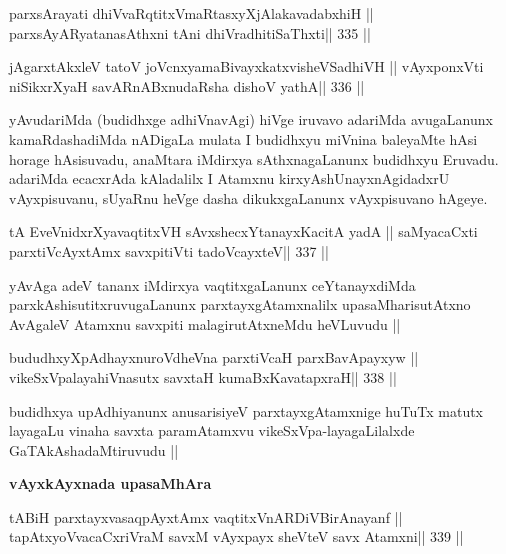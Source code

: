 \begin{shl}
parxsArayati dhiVvaRqtitxVmaRtasxyXjAlakavadabxhiH ||
parxsAyAR\s\s yatanasAthxni tAni dhiVradhitiSaThxti\hfill || 335 ||
\end{shl}

\begin{shl}
jAgarxtAkxleV tatoV joVcnx\s yamaBivayxkatxvisheVSadhiVH ||
vAyxponxVti niSikxrXyaH savARnABxnudaRsha dishoV yathA\hfill || 336 ||
\end{shl}

\begin{artha}
yAvudariMda (budidhxge adhiVnavAgi) hiVge iruvavo adariMda avugaLanunx kamaRdashadiMda nADigaLa mulata I budidhxyu miVnina baleyaMte hAsi horage hAsisuvadu, anaMtara iMdirxya sAthxnagaLanunx budidhxyu Eruvadu. adariMda ecacxrAda kAladalilx I Atamxnu kirxyAshUnayxnAgidadxrU vAyxpisuvanu, sUyaRnu heVge dasha dikukxgaLanunx vAyxpisuvano hAgeye.
\end{artha}

\begin{shl}
tA EveVnidxrXyavaqtitxVH sAvxshecxYtanayxKacitA yadA ||
saMyacaCxti parxtiVcAyxtAmx savxpitiVti tadoVcayxteV\hfill || 337 ||
\end{shl}

\begin{artha}
yAvAga adeV tananx iMdirxya vaqtitxgaLanunx ceYtanayxdiMda parxkAshisutitxruvugaLanunx parxtayxgAtamxnalilx upasaMharisutAtxno AvAgaleV Atamxnu savxpiti malagirutAtxneMdu heVLuvudu ||
\end{artha}

\begin{shl}
bududhxyXpAdhayxnuroVdheVna parxtiVcaH parxBavApayxyw ||
vikeSxVpalayahiVnasutx savxtaH kumaBxKavatapxraH\hfill || 338 ||
\end{shl}

\begin{artha}
budidhxya upAdhiyanunx anusarisiyeV parxtayxgAtamxnige huTuTx matutx layagaLu vinaha savxta paramAtamxvu vikeSxVpa-layagaLilalxde GaTAkAshadaMtiruvudu ||
\end{artha}

\begin{center}
{\bf vAyxkAyxnada upasaMhAra}
\end{center}

\begin{shl}
tABiH parxtayxvasaqpAyx\s\s tAmx vaqtitxVnARDiVBirAnayanf ||
\footnotemark[1]tapAtxyoVvacaCxriVraM savxM vAyxpayx sheVteV savx Atamxni\hfill || 339 ||
\end{shl}

